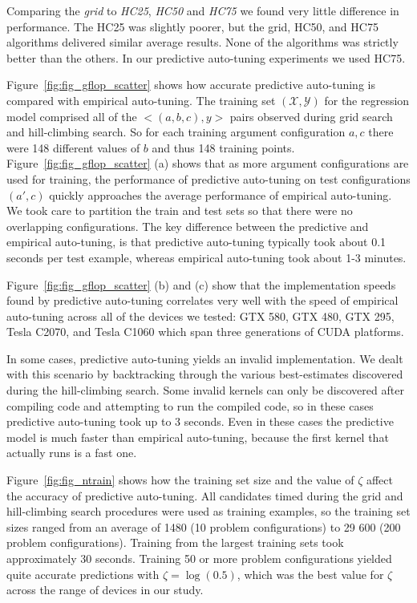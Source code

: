 \documentclass{sig-alternate}
\begin{document}
Comparing the {\em grid} to {\em HC25}, {\em HC50} and {\em HC75} we found very
little difference in performance.  The HC25 was slightly poorer, but the grid,
HC50, and HC75 algorithms delivered similar average results. None of the
algorithms was strictly better than the others.  In our predictive
auto-tuning experiments we used HC75.


Figure~\ref{fig:fig_gflop_scatter} shows how accurate predictive auto-tuning is compared with empirical auto-tuning.
The training set $(\mathcal{X}, \mathcal{Y})$ for the regression model comprised
all of the $<(a,b,c), y>$ pairs observed during grid search and hill-climbing search.
So for each training argument configuration $a,c$ there were 148 different values of $b$ and thus 148 training points.
Figure~\ref{fig:fig_gflop_scatter} (a) shows that as more argument configurations are used for training,
the performance of predictive auto-tuning on test configurations $(a', c)$ quickly
approaches the average performance of empirical auto-tuning.
We took care to partition the train and test sets so that there were no overlapping configurations.
The key difference between the predictive and empirical auto-tuning,
is that predictive auto-tuning
typically took about 0.1 seconds per test example, whereas empirical auto-tuning took about 1-3 minutes.

Figure~\ref{fig:fig_gflop_scatter} (b) and (c) show that the implementation
speeds found by predictive auto-tuning correlates very well with the speed of
empirical auto-tuning across all of the devices we tested: GTX 580, GTX 480,
GTX 295, Tesla C2070, and Tesla C1060 which span three generations of
CUDA platforms.

In some cases, predictive auto-tuning yields an invalid implementation.  We
dealt with this scenario by backtracking through the various best-estimates
discovered during the hill-climbing search.  Some invalid kernels can only be
discovered after compiling code and attempting to run the compiled code, so in
these cases predictive auto-tuning took up to 3 seconds.  Even in these cases
the predictive model is much faster than empirical auto-tuning, because the
first kernel that actually runs is a fast one.

Figure~\ref{fig:fig_ntrain} shows how the training set size
and the value of $\zeta$ affect the accuracy of predictive auto-tuning.
All candidates timed during the grid and
hill-climbing search procedures were used as training examples, so the training
set sizes ranged from an average of 1480 (10 problem configurations) to 29 600
(200 problem configurations).
Training from the largest training sets took approximately 30 seconds.
Training 50 or more problem configurations yielded quite accurate predictions
with $\zeta=\log(0.5)$, which was the best value for $\zeta$ across the range of
devices in our study.
\end{document}
